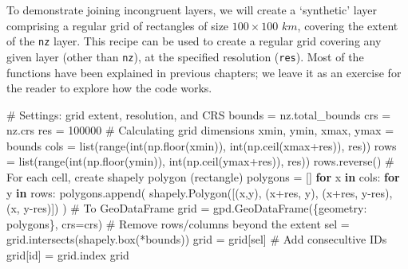 \documentclass[
  letterpaper,
]{krantz}
\newenvironment{Shaded}{\begin{snugshade}}{\end{snugshade}}
\newcommand{\BuiltInTok}[1]{\textcolor[rgb]{0.00,0.23,0.31}{#1}}
\newcommand{\CommentTok}[1]{\textcolor[rgb]{0.37,0.37,0.37}{#1}}
\newcommand{\ControlFlowTok}[1]{\textcolor[rgb]{0.00,0.23,0.31}{\textbf{#1}}}
\newcommand{\DecValTok}[1]{\textcolor[rgb]{0.68,0.00,0.00}{#1}}
\newcommand{\KeywordTok}[1]{\textcolor[rgb]{0.00,0.23,0.31}{\textbf{#1}}}
\newcommand{\NormalTok}[1]{\textcolor[rgb]{0.00,0.23,0.31}{#1}}
\newcommand{\OperatorTok}[1]{\textcolor[rgb]{0.37,0.37,0.37}{#1}}
\newcommand{\StringTok}[1]{\textcolor[rgb]{0.13,0.47,0.30}{#1}}
\begin{document}
To demonstrate joining incongruent layers, we will create a `synthetic'
layer comprising a regular grid of rectangles of size \(100\times100\)
\(km\), covering the extent of the \texttt{nz} layer. This recipe can be
used to create a regular grid covering any given layer (other than
\texttt{nz}), at the specified resolution (\texttt{res}). Most of the
functions have been explained in previous chapters; we leave it as an
exercise for the reader to explore how the code works.

\begin{Shaded}
\begin{Highlighting}[]
\CommentTok{\# Settings: grid extent, resolution, and CRS}
\NormalTok{bounds }\OperatorTok{=}\NormalTok{ nz.total\_bounds}
\NormalTok{crs }\OperatorTok{=}\NormalTok{ nz.crs}
\NormalTok{res }\OperatorTok{=} \DecValTok{100000}
\CommentTok{\# Calculating grid dimensions}
\NormalTok{xmin, ymin, xmax, ymax }\OperatorTok{=}\NormalTok{ bounds}
\NormalTok{cols }\OperatorTok{=} \BuiltInTok{list}\NormalTok{(}\BuiltInTok{range}\NormalTok{(}\BuiltInTok{int}\NormalTok{(np.floor(xmin)), }\BuiltInTok{int}\NormalTok{(np.ceil(xmax}\OperatorTok{+}\NormalTok{res)), res))}
\NormalTok{rows }\OperatorTok{=} \BuiltInTok{list}\NormalTok{(}\BuiltInTok{range}\NormalTok{(}\BuiltInTok{int}\NormalTok{(np.floor(ymin)), }\BuiltInTok{int}\NormalTok{(np.ceil(ymax}\OperatorTok{+}\NormalTok{res)), res))}
\NormalTok{rows.reverse()}
\CommentTok{\# For each cell, create \textquotesingle{}shapely\textquotesingle{} polygon (rectangle)}
\NormalTok{polygons }\OperatorTok{=}\NormalTok{ []}
\ControlFlowTok{for}\NormalTok{ x }\KeywordTok{in}\NormalTok{ cols:}
    \ControlFlowTok{for}\NormalTok{ y }\KeywordTok{in}\NormalTok{ rows:}
\NormalTok{        polygons.append(}
\NormalTok{            shapely.Polygon([(x,y), (x}\OperatorTok{+}\NormalTok{res, y), (x}\OperatorTok{+}\NormalTok{res, y}\OperatorTok{{-}}\NormalTok{res), (x, y}\OperatorTok{{-}}\NormalTok{res)])}
\NormalTok{        )}
\CommentTok{\# To \textquotesingle{}GeoDataFrame\textquotesingle{}}
\NormalTok{grid }\OperatorTok{=}\NormalTok{ gpd.GeoDataFrame(\{}\StringTok{\textquotesingle{}geometry\textquotesingle{}}\NormalTok{: polygons\}, crs}\OperatorTok{=}\NormalTok{crs)}
\CommentTok{\# Remove rows/columns beyond the extent}
\NormalTok{sel }\OperatorTok{=}\NormalTok{ grid.intersects(shapely.box(}\OperatorTok{*}\NormalTok{bounds))}
\NormalTok{grid }\OperatorTok{=}\NormalTok{ grid[sel]}
\CommentTok{\# Add consecultive IDs}
\NormalTok{grid[}\StringTok{\textquotesingle{}id\textquotesingle{}}\NormalTok{] }\OperatorTok{=}\NormalTok{ grid.index}
\NormalTok{grid}
\end{Highlighting}
\end{Shaded}
\end{document}
